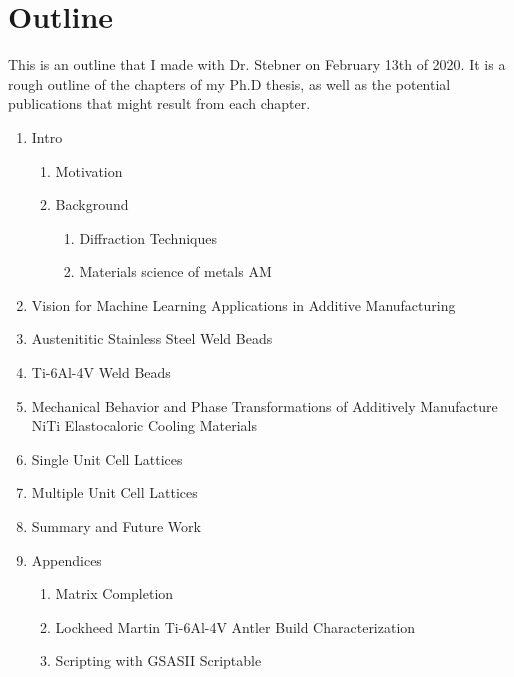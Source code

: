 \chapter{Outline}
This is an outline that I made with Dr. Stebner on February 13th of 2020. It is a rough outline of the chapters of my Ph.D thesis, as well as the potential publications that might result from each chapter.

\begin{enumerate}
	\item Intro 
		\begin{enumerate}
		\item Motivation
		\item Background 
			\begin{enumerate}
			\item Diffraction Techniques
			\item Materials science of metals AM
			\end{enumerate}
		\end{enumerate}
	\item Vision for Machine Learning Applications in Additive Manufacturing
	\item Austenititic Stainless Steel Weld Beads
	\item Ti-6Al-4V Weld Beads 
	\item Mechanical Behavior and Phase Transformations of Additively Manufacture NiTi Elastocaloric Cooling Materials 
	\item Single Unit Cell Lattices
	\item Multiple Unit Cell Lattices
	\item Summary and Future Work
	\item Appendices
		\begin{enumerate}
		\item Matrix Completion
		\item Lockheed Martin Ti-6Al-4V Antler Build Characterization
		\item Scripting with GSASII Scriptable
		\end{enumerate}
\end{enumerate} 